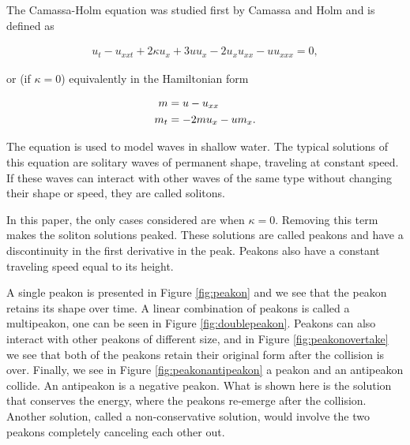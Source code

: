 The Camassa-Holm equation was studied first by Camassa and Holm \cite{camassa1993integrable} and is defined as

\begin{align*}
u_{t} - u_{xxt} + 2\kappa u_{x} + 3uu_{x} - 2u_{x}u_{xx} - uu_{xxx} = 0,
\end{align*}

or (if $\kappa = 0$) equivalently in the Hamiltonian form

\begin{align}
m &= u - u_{xx} \notag \\
m_t &= -2mu_x - um_x.
\label{eq:CHhamiltonian}
\end{align}

The equation is used to model waves in shallow water. The typical solutions of this equation are solitary waves of permanent shape, traveling at constant speed. If these waves can interact with other waves of the same type without changing their shape or speed, they are called solitons. 



In this paper, the only cases considered are when $\kappa = 0$. Removing this term makes the soliton solutions peaked. These solutions are called peakons and have a discontinuity in the first derivative in the peak. Peakons also have a constant traveling speed equal to its height.

A single peakon is presented in Figure \ref{fig:peakon} and we see that the peakon retains its shape over time. A linear combination of peakons is called a multipeakon, one can be seen in Figure \ref{fig:doublepeakon}. Peakons can also interact with other peakons of different size, and in Figure \ref{fig:peakonovertake} we see that both of the peakons retain their original form after the collision is over. Finally, we see in Figure \ref{fig:peakonantipeakon} a peakon and an antipeakon collide. An antipeakon is a negative peakon. What is shown here is the solution that conserves the energy, where the peakons re-emerge after the collision. Another solution, called a non-conservative solution, would involve the two peakons completely canceling each other out.

